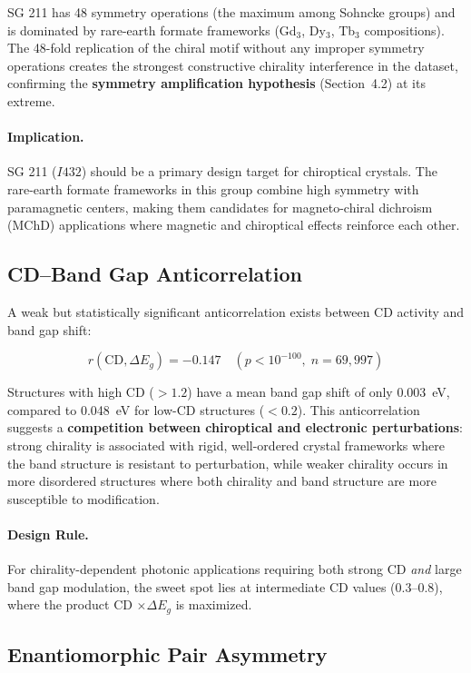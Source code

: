 \documentclass[11pt,a4paper]{article}
\begin{document}
\noindent SG 211 has 48 symmetry operations (the maximum among Sohncke groups) and is dominated by rare-earth formate frameworks (Gd$_3$, Dy$_3$, Tb$_3$ compositions). The 48-fold replication of the chiral motif without any improper symmetry operations creates the strongest constructive chirality interference in the dataset, confirming the \textbf{symmetry amplification hypothesis} (Section~4.2) at its extreme.

\paragraph{Implication.} SG 211 ($I432$) should be a primary design target for chiroptical crystals. The rare-earth formate frameworks in this group combine high symmetry with paramagnetic centers, making them candidates for magneto-chiral dichroism (MChD) applications where magnetic and chiroptical effects reinforce each other.

\subsection{CD--Band Gap Anticorrelation}

A weak but statistically significant anticorrelation exists between CD activity and band gap shift:

\begin{equation}
r(\text{CD}, \Delta E_g) = -0.147 \quad (p < 10^{-100}, \; n = 69{,}997)
\end{equation}

\noindent Structures with high CD ($>1.2$) have a mean band gap shift of only 0.003~eV, compared to 0.048~eV for low-CD structures ($<0.2$). This anticorrelation suggests a \textbf{competition between chiroptical and electronic perturbations}: strong chirality is associated with rigid, well-ordered crystal frameworks where the band structure is resistant to perturbation, while weaker chirality occurs in more disordered structures where both chirality and band structure are more susceptible to modification.

\paragraph{Design Rule.} For chirality-dependent photonic applications requiring both strong CD \emph{and} large band gap modulation, the sweet spot lies at intermediate CD values (0.3--0.8), where the product CD $\times \Delta E_g$ is maximized.

\subsection{Enantiomorphic Pair Asymmetry}
\end{document}
